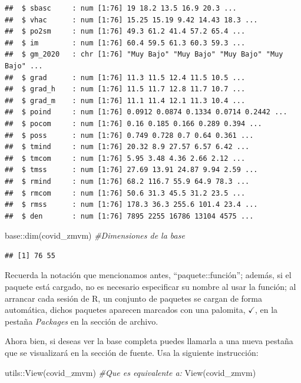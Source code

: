 \documentclass[
  11pt,
  oneside]{book}
\newenvironment{Shaded}{\begin{snugshade}}{\end{snugshade}}
\newcommand{\CommentTok}[1]{\textcolor[rgb]{0.56,0.35,0.01}{\textit{#1}}}
\newcommand{\FunctionTok}[1]{\textcolor[rgb]{0.00,0.00,0.00}{#1}}
\newcommand{\NormalTok}[1]{#1}
\newcommand{\SpecialCharTok}[1]{\textcolor[rgb]{0.00,0.00,0.00}{#1}}
\begin{document}
\begin{verbatim}
##  $ sbasc     : num [1:76] 19 18.2 13.5 16.9 20.3 ...
##  $ vhac      : num [1:76] 15.25 15.19 9.42 14.43 18.3 ...
##  $ po2sm     : num [1:76] 49.3 61.2 41.4 57.2 65.4 ...
##  $ im        : num [1:76] 60.4 59.5 61.3 60.3 59.3 ...
##  $ gm_2020   : chr [1:76] "Muy Bajo" "Muy Bajo" "Muy Bajo" "Muy Bajo" ...
##  $ grad      : num [1:76] 11.3 11.5 12.4 11.5 10.5 ...
##  $ grad_h    : num [1:76] 11.5 11.7 12.8 11.7 10.7 ...
##  $ grad_m    : num [1:76] 11.1 11.4 12.1 11.3 10.4 ...
##  $ poind     : num [1:76] 0.0912 0.0874 0.1334 0.0714 0.2442 ...
##  $ pocom     : num [1:76] 0.16 0.185 0.166 0.289 0.394 ...
##  $ poss      : num [1:76] 0.749 0.728 0.7 0.64 0.361 ...
##  $ tmind     : num [1:76] 20.32 8.9 27.57 6.57 6.42 ...
##  $ tmcom     : num [1:76] 5.95 3.48 4.36 2.66 2.12 ...
##  $ tmss      : num [1:76] 27.69 13.91 24.87 9.94 2.59 ...
##  $ rmind     : num [1:76] 68.2 116.7 55.9 64.9 78.3 ...
##  $ rmcom     : num [1:76] 50.6 31.3 45.5 31.2 23.5 ...
##  $ rmss      : num [1:76] 178.3 36.3 255.6 101.4 23.4 ...
##  $ den       : num [1:76] 7895 2255 16786 13104 4575 ...
\end{verbatim}

\begin{Shaded}
\begin{Highlighting}[]
\NormalTok{base}\SpecialCharTok{::}\FunctionTok{dim}\NormalTok{(covid\_zmvm) }\CommentTok{\#Dimensiones de la base}
\end{Highlighting}
\end{Shaded}

\begin{verbatim}
## [1] 76 55
\end{verbatim}

Recuerda la notación que mencionamos antes, ``paquete::función''; además, si el paquete está cargado, no es necesario especificar su nombre al usar la función; al arrancar cada sesión de R, un conjunto de paquetes se cargan de forma automática, dichos paquetes aparecen marcados con una palomita, \(\checkmark\), en la pestaña \emph{Packages} en la sección de archivo.

Ahora bien, si deseas ver la base completa puedes llamarla a una nueva pestaña que se visualizará en la sección de fuente. Usa la siguiente instrucción:

\begin{Shaded}
\begin{Highlighting}[]
\NormalTok{utils}\SpecialCharTok{::}\FunctionTok{View}\NormalTok{(covid\_zmvm)}
\CommentTok{\#Que es equivalente a:}
\FunctionTok{View}\NormalTok{(covid\_zmvm)}
\end{Highlighting}
\end{Shaded}
\end{document}
